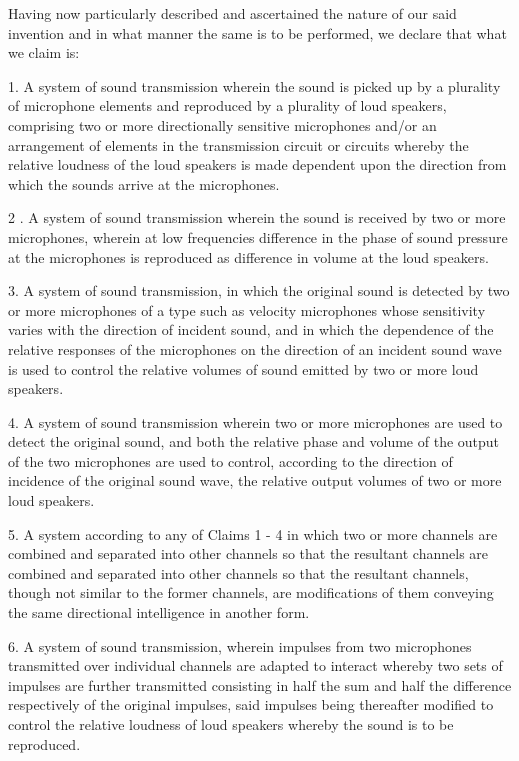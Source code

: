 \documentclass[11pt]{article}
\begin{document}
\begin{multicols*}{2}
Having now particularly described and ascertained the nature of our said invention and in what manner the same is to be performed, we declare that what we claim is:

1. A system of sound transmission wherein the sound is picked up by a plurality of microphone elements and reproduced by a plurality of loud speakers, comprising two or more directionally sensitive microphones and/or an arrangement of elements in the transmission circuit or circuits whereby the relative loudness of the loud speakers is made dependent upon the direction from which the sounds arrive at the microphones.

2 . A system of sound transmission wherein the sound is received by two or more microphones, wherein at low frequencies difference in the phase of sound pressure at the microphones is reproduced as difference in volume at the loud speakers. 

3. A system of sound transmission, in which the original sound is detected by two or more microphones of a type such as velocity microphones whose sensitivity varies with the direction of incident sound, and in which the dependence of the relative responses of the microphones on the direction of an incident sound wave is used to control the relative volumes of sound emitted by two or more loud speakers. 

4. A system of sound transmission wherein two or more microphones are used to detect the original sound, and both the relative phase and volume of the output of the two microphones are used to control, according to the direction of incidence of the original sound wave, the relative output volumes of two or more loud speakers.

5. A system according to any of Claims 1 - 4 in which two or more channels are combined and separated into other channels so that the resultant channels are combined and separated into other channels so that the resultant channels, though not similar to the former channels, are modifications of them conveying the same directional intelligence in another form.

6. A system of sound transmission, wherein impulses from two microphones transmitted over individual channels are adapted to interact whereby two sets of impulses are further transmitted consisting in half the sum and half the difference respectively of the original impulses, said impulses being thereafter modified to control the relative loudness of loud speakers whereby the sound is to be reproduced.


\end{multicols*}
\end{document}
